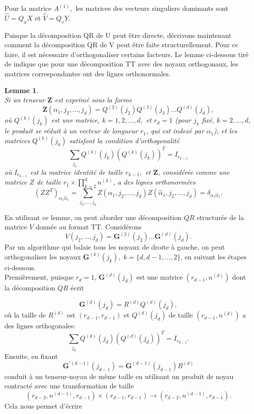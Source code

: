 \documentclass[11pt,a4paper,oneside]{book}
\newtheorem{lem}{Lemme}[chapter]
\def\G{\mathfrak G}
\def\G{\mathbf G}
\begin{document}
	 Pour la matrice $A^{(1)},$ les matrices des vecteurs singuliers dominants sont $\hat{U} = Q_uX$ et $\hat{V} = Q_vY.$
	 
	Puisque la décomposition QR de U peut être directe, décrivons maintenant comment la décomposition QR de V peut être faite structurellement. Pour ce faire, il est nécessaire d'orthogonaliser certains facteurs. Le lemme ci-dessous tiré de \cite[p.2302]{oseledets2011tensor} indique que pour une décomposition TT avec des noyaux orthogonaux, les matrices correspondantes ont des lignes orthonormales.

\begin{lem}\emph{\\}
Si un tenseur $\mathbf{Z}$ est exprimé sous la forme
\begin{equation}
\mathbf{Z} (\alpha_1,j_2,\ldots,j_d) = Q^{(2)}(j_2)Q^{(3)}(j_3)\ldots Q^{(d)}(j_d),
\end{equation}
où $Q^{(k)}(j_k)$ est une matrice, $k = 1,2,\ldots,d,$ et $r_{d} =1$ (pour $j_k$ fixé, $k=2,\ldots,d$, le produit se réduit à un vecteur de longueur $ r_{1} $,
qui est indexé par $\alpha_1$), et les matrices $Q^{(k)}(j_k)$ satisfont la condition d'orthogonalité 
\begin{equation}
\label{TT:Q_orthog}
\sum_{j_k}Q^{(k)}(j_k)\left(Q^{(k)}(j_k)\right)^T = I_{r_{k-1}}
\end{equation}
où $I_{r_{k-1}}$ est la matrice identité de taille $r_{k-1},$ et $\mathbf{Z}$, considérée comme une matrice $Z$ de taille $r_1 \times \prod_{k = 2}^dn^{(k)}$, a des lignes orthonormées$$
(ZZ^T)_{\alpha_1\hat{\alpha}_1} = \sum_{j_2,\ldots,j_d}Z(\alpha_1,j_2,\ldots,j_d)Z(\hat{\alpha}_1,j_2,\ldots,j_d) = \delta_{\alpha_1\hat{\alpha}_1}.$$
\end{lem}
En utilisant ce lemme, on peut aborder une décomposition $ QR $ structurée de la matrice $ V $ donnée au format TT. Considérons	$$V(j_2,\ldots,j_d) = \G^{(2)}(j_2)\ldots \G^{(d)}(j_d).$$
Par un algorithme qui balaie tous les noyaux de droite à gauche, on peut orthogonaliser les noyaux $\G^{(k)}(j_k),\; k = \lbrace{d,d-1,\ldots,2}\rbrace$, en suivant les étapes ci-dessous.\\


Premièrement, puisque $r_d = 1$, $\G^{(d)}(j_d)$ est une matrice $(r_{d-1},n^{(d)})$ dont la décomposition $ QR $ écrit

$$\G^{(d)}(j_d) = R^{(d)}Q^{(d)}(j_d),$$ où la taille de $R^{(d)}$ est $(r_{d-1},r_{d-1})$ et $Q^{(d)}(j_d)$ de taille $(r_{d-1},n^{(d)})$  a des lignes orthogonales:
$$\sum_{j_d}Q^{(d)}(j_d)\left(Q^{(d)}(j_d)\right)^T = I_{r_{d-1}}.$$
Ensuite, en fixant$$\G^{'(d-1)}(j_{d-1}) = \G^{(d-1)}(j_{d-1})R^{(d)}$$
conduit à un tenseur-noyau de même taille en utilisant un produit de noyau contracté avec une transformation de taille
 $$\left(r_{d-2},n^{(d-1)},r_{d-1}\right) \times \left(r_{d-1},r_{d-1}\right) \longrightarrow  \left(r_{d-2},n^{(d-1)},r_{d-1}\right).$$ 
 Cela nous permet d'écrire
 	
\end{document}
